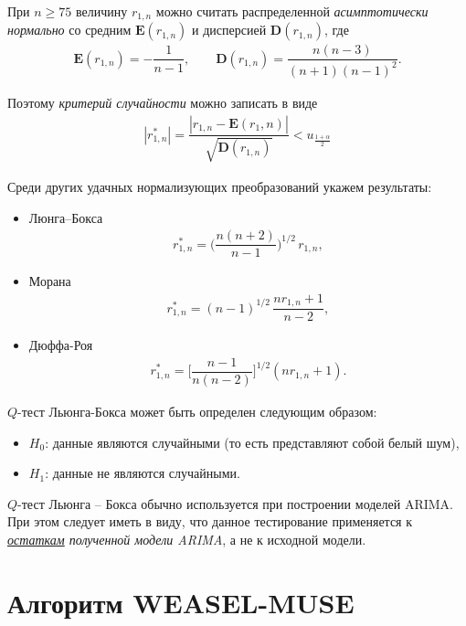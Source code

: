 \documentclass[%
	11pt,
	a4paper,
	utf8,
		]{article}
\begin{document}
При $ n \geqslant 75 $ величину $ r_{1, n} $ можно считать распределенной \emph{асимптотически нормально} со средним $ \mathbf{E}(r_{1, n}) $ и дисперсией $ \mathbf{D}(r_{1, n}) $, где 
\begin{align*}
	\mathbf{E}(r_{1, n}) = - \dfrac{1}{n - 1}, \qquad \mathbf{D}(r_{1, n}) = \dfrac{n (n - 3)}{(n + 1)(n - 1)^2}.
\end{align*}

Поэтому \emph{критерий случайности} можно записать в виде
\begin{align*}
	| r_{1, n}^* | = \dfrac{ | r_{1, n} - \mathbf{E}(r_1, n) | }{ \sqrt{\mathbf{D}(r_{1, n})} } < u_{ \frac{1 + \alpha}{2} }
\end{align*}

Среди других удачных нормализующих преобразований укажем результаты:
\begin{itemize}
	\item Люнга--Бокса
	\begin{align*}
		r_{1, n}^* = \Bigg( \dfrac{n (n +2)}{n - 1} \Bigg)^{1/2} \, r_{1, n},
	\end{align*}

    \item Морана
    \begin{align*}
    	r_{1, n}^* = (n - 1)^{1/2} \, \dfrac{ n r_{1, n} + 1 }{n - 2},
    \end{align*}

    \item Дюффа-Роя
    \begin{align*}
    	r_{1, n}^* = \Bigg[ \dfrac{n - 1}{n(n - 2)} \Bigg]^{1/2} {(n r_{1, n} + 1)}.
    \end{align*}
\end{itemize}


$ Q $-тест Льюнга-Бокса  может быть определен следующим образом:
\begin{itemize}
	\item $ H_0 $: данные являются случайными (то есть представляют собой белый шум),
	
	\item $ H_1 $: данные не являются случайными.
\end{itemize}

$ Q $-тест Льюнга -- Бокса обычно используется при построении моделей ARIMA. При этом следует иметь в виду, что данное тестирование применяется к \emph{\underline{остаткам} полученной модели ARIMA}, а не к исходной модели.

\section{Алгоритм WEASEL-MUSE}
\end{document}
